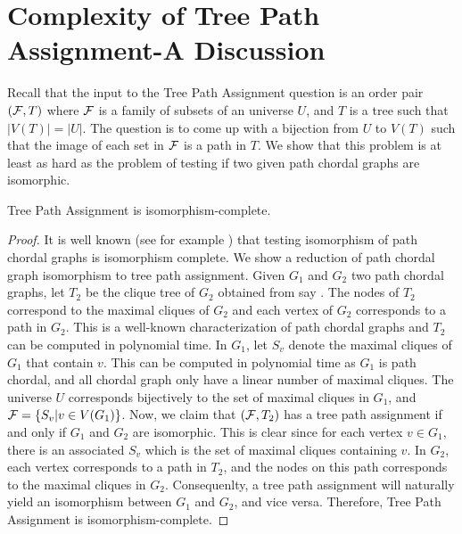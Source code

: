 \documentclass{llncs}
\def\cF{{\cal F}}
\begin{document}
\section{Complexity of Tree Path Assignment-A Discussion} \label{complexity}
Recall that the input to the Tree Path Assignment question is an order pair $(\cF,T)$ where $\cF$ is a family of subsets of an universe $U$, and $T$ is a tree such that $|V(T)| = |U|$.  The question is to come up with a bijection from
$U$ to $V(T)$ such that the image of each set in $\cF$ is a path in $T$.  We show that this problem is at least as hard as the problem of testing if two given path chordal graphs are isomorphic.  
\begin{theorem} \label{thm:isocomp}
Tree Path Assignment is isomorphism-complete.
\end{theorem}
\begin{proof}
It is well known (see for example \cite{kklv10}) that testing isomorphism of path chordal graphs is isomorphism complete.  We show a reduction of path chordal graph isomorphism to tree path assignment.  
Given $G_1$ and $G_2$ two path chordal graphs, let $T_2$ be the clique tree of $G_2$ obtained from say \cite{gav78}.  The nodes of $T_2$ correspond to the maximal cliques of $G_2$ and each vertex of $G_2$ corresponds to a path in $G_2$.  This is a well-known characterization of path chordal graphs and $T_2$ can be computed in polynomial time.
In $G_1$, let $S_v$ denote the maximal cliques of $G_1$ that contain $v$.  This can be computed in polynomial time
as $G_1$ is path chordal, and all chordal graph only have a linear number of maximal cliques.  
The universe $U$ corresponds bijectively to the set of maximal cliques in $G_1$, and $\cF = \{S_v | v \in V(G_1)\}$.
Now, we claim that $(\cF, T_2)$ has a tree path assignment if and only if $G_1$ and $G_2$ are isomorphic.  This is clear since for each vertex $v \in G_1$, there is an associated $S_v$ which is the set of maximal cliques containing $v$.  In $G_2$, each vertex corresponds to a path in $T_2$, and the nodes on this path corresponds to the maximal cliques in $G_2$.  Consequenlty, a tree path assignment will naturally yield an isomorphism between $G_1$ and $G_2$, and vice versa.  Therefore, Tree Path Assignment is isomorphism-complete.
\end{proof}
\end{document}
